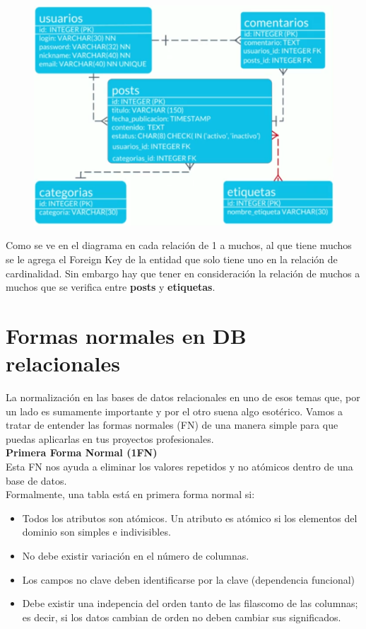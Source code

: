 \documentclass{article}
\begin{document}
\begin{figure}[h!]
    \centering
      \includegraphics[scale=0.45]{./Pictures/028_diagrama_fisico.png}
\end{figure}

Como se ve en el diagrama en cada relación de 1 a muchos, al que tiene muchos
se le agrega el Foreign Key de la entidad que solo tiene uno en la relación de
cardinalidad. Sin embargo hay que tener en consideración la relación de muchos
a muchos que se verifica entre \textbf{posts} y \textbf{etiquetas}.


\section{Formas normales en DB relacionales}%
La normalización en las bases de datos relacionales en uno de esos temas que,
por un lado es sumamente importante y por el otro suena algo esotérico. Vamos a
tratar de entender las formas normales (FN) de una manera simple para que
puedas aplicarlas en tus proyectos profesionales.\\

\textbf{Primera Forma Normal (1FN)}\\
Esta FN nos ayuda a eliminar los valores repetidos y no atómicos dentro de una
base de datos.\\

Formalmente, una tabla está en primera forma normal si:

\begin{itemize}
  \item Todos los atributos son atómicos. Un atributo es atómico si los
    elementos del dominio son simples e indivisibles.
  \item No debe existir variación en el número de columnas.
  \item Los campos no clave deben identificarse por la clave (dependencia
    funcional)
  \item Debe existir una indepencia del orden tanto de las filascomo de las
    columnas; es decir, si los datos cambian de orden no deben cambiar sus
    significados.
\end{itemize}
\end{document}
